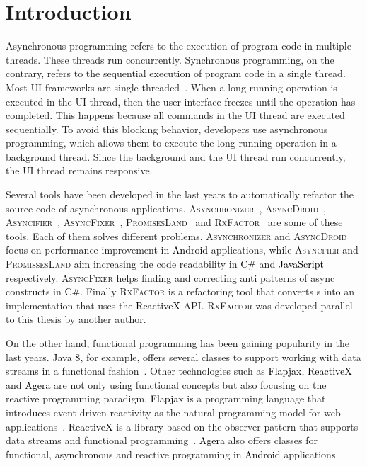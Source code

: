 \documentclass[type=bsc,accentcolor=tud9c]{tudthesis}
\newcommand{\framework}[1]{\textcolor{black}{#1}}
\begin{document}
\chapter{Introduction}
\label{chapter:introduction}
Asynchronous programming refers to the execution of program code in multiple threads. These threads run concurrently. Synchronous programming, on the contrary, refers to the sequential execution of program code in a single thread. Most UI frameworks are single threaded~\cite{uiSingleThreaded}. When a long-running operation is executed in the UI thread, then the user interface freezes until the operation has completed. This happens because all commands in the UI thread are executed sequentially. To avoid this blocking behavior, developers use asynchronous programming, which allows them to execute the long-running operation in a background thread. Since the background and the UI thread run concurrently, the UI thread remains responsive.

Several tools have been developed in the last years to automatically refactor the source code of asynchronous applications. \textsc{Asynchronizer}~\cite{paperRetrofittingConcurrency}, \textsc{AsyncDroid}~\cite{paperStudyRefactoring}, \textsc{Asyncifier}~\cite{paperAsyncMobile}, \textsc{AsyncFixer}~\cite{paperAsyncMobile}, \textsc{PromisesLand}~\cite{thesisJavaScript} and \textsc{RxFactor}~\cite{thesisRxFactor} are some of these tools. Each of them solves different problems. \textsc{Asynchronizer} and \textsc{AsyncDroid} focus on performance improvement in \framework{Android} applications, while \textsc{Asyncfier} and \textsc{PromissesLand} aim increasing the code readability in \framework{C\#} and \framework{JavaScript} respectively. \textsc{AsyncFixer} helps finding and correcting anti patterns of async constructs in \framework{C\#}. Finally \textsc{RxFactor} is a refactoring tool that converts s into an implementation that uses the \framework{ReactiveX} API. \textsc{RxFactor} was developed parallel to this thesis by another author.

On the other hand, functional programming has been gaining popularity in the last years. \framework{Java 8}, for example, offers several classes to support working with data streams in a functional fashion~\cite{bookJava8Streams}. Other technologies such as \framework{Flapjax}, \framework{ReactiveX} and \framework{Agera} are not only using functional concepts but also focusing on the reactive programming paradigm. \framework{Flapjax} is a programming language that introduces event-driven reactivity as the natural programming model for web applications~\cite{paperFlapjax}. \framework{ReactiveX} is a library based on the observer pattern that supports data streams and functional programming~\cite{reactiveX}. \framework{Agera} also offers classes for functional, asynchronous and reactive programming in \framework{Android} applications~\cite{agera}.
\end{document}
